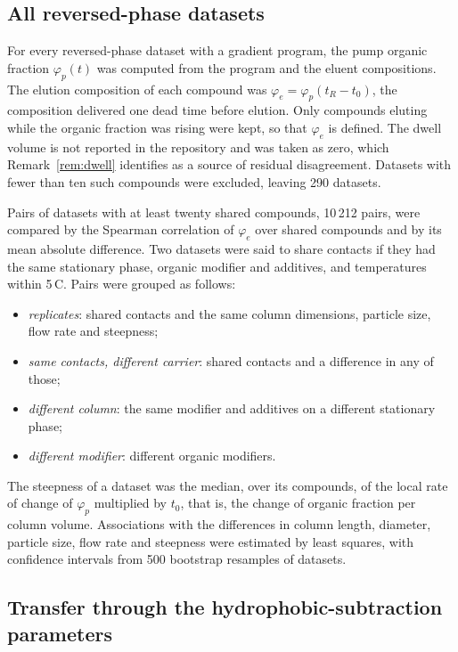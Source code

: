 \documentclass[11pt,a4paper]{article}
\theoremstyle{definition}
\theoremstyle{remark}
\begin{document}
\subsection{All reversed-phase datasets}

For every reversed-phase dataset with a gradient program, the pump organic fraction $\varphi_p(t)$ was computed from the program and the eluent compositions.
The elution composition of each compound was $\varphi_e=\varphi_p(t_R-t_0)$, the composition delivered one dead time before elution.
Only compounds eluting while the organic fraction was rising were kept, so that $\varphi_e$ is defined.
The dwell volume is not reported in the repository and was taken as zero, which Remark~\ref{rem:dwell} identifies as a source of residual disagreement.
Datasets with fewer than ten such compounds were excluded, leaving 290 datasets.

Pairs of datasets with at least twenty shared compounds, 10\,212 pairs, were compared by the Spearman correlation of $\varphi_e$ over shared compounds and by its mean absolute difference.
Two datasets were said to share contacts if they had the same stationary phase, organic modifier and additives, and temperatures within 5\,\textdegree C.
Pairs were grouped as follows:
\begin{itemize}[leftmargin=2em,nosep]
\item \emph{replicates}: shared contacts and the same column dimensions, particle size, flow rate and steepness;
\item \emph{same contacts, different carrier}: shared contacts and a difference in any of those;
\item \emph{different column}: the same modifier and additives on a different stationary phase;
\item \emph{different modifier}: different organic modifiers.
\end{itemize}
The steepness of a dataset was the median, over its compounds, of the local rate of change of $\varphi_p$ multiplied by $t_0$, that is, the change of organic fraction per column volume.
Associations with the differences in column length, diameter, particle size, flow rate and steepness were estimated by least squares, with confidence intervals from 500 bootstrap resamples of datasets.

\subsection{Transfer through the hydrophobic-subtraction parameters}
\end{document}
